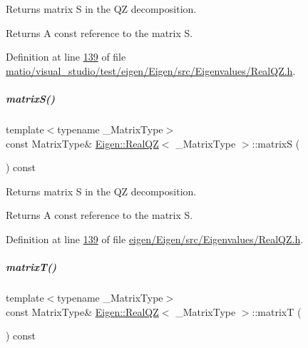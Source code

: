 Returns matrix S in the QZ decomposition. 

\begin{DoxyReturn}{Returns}
A const reference to the matrix S. 
\end{DoxyReturn}


Definition at line \hyperlink{matio_2visual__studio_2test_2eigen_2_eigen_2src_2_eigenvalues_2_real_q_z_8h_source_l00139}{139} of file \hyperlink{matio_2visual__studio_2test_2eigen_2_eigen_2src_2_eigenvalues_2_real_q_z_8h_source}{matio/visual\+\_\+studio/test/eigen/\+Eigen/src/\+Eigenvalues/\+Real\+Q\+Z.\+h}.

\mbox{\label{group___eigenvalues___module_ad24d7bf534afb55adaef00f00846adaf}} 
\subparagraph{\texorpdfstring{matrix\+S()}{matrixS()}\hspace{0.1cm}{\footnotesize\ttfamily [2/2]}}
{\footnotesize\ttfamily template$<$typename \+\_\+\+Matrix\+Type$>$ \\
const Matrix\+Type\& \hyperlink{group___eigenvalues___module_class_eigen_1_1_real_q_z}{Eigen\+::\+Real\+QZ}$<$ \+\_\+\+Matrix\+Type $>$\+::matrixS (\begin{DoxyParamCaption}{ }\end{DoxyParamCaption}) const\hspace{0.3cm}{\ttfamily [inline]}}



Returns matrix S in the QZ decomposition. 

\begin{DoxyReturn}{Returns}
A const reference to the matrix S. 
\end{DoxyReturn}


Definition at line \hyperlink{eigen_2_eigen_2src_2_eigenvalues_2_real_q_z_8h_source_l00139}{139} of file \hyperlink{eigen_2_eigen_2src_2_eigenvalues_2_real_q_z_8h_source}{eigen/\+Eigen/src/\+Eigenvalues/\+Real\+Q\+Z.\+h}.

\mbox{\label{group___eigenvalues___module_a8dc963d8ea2a17df9d8d718e9e34d06f}} 
\subparagraph{\texorpdfstring{matrix\+T()}{matrixT()}\hspace{0.1cm}{\footnotesize\ttfamily [1/2]}}
{\footnotesize\ttfamily template$<$typename \+\_\+\+Matrix\+Type$>$ \\
const Matrix\+Type\& \hyperlink{group___eigenvalues___module_class_eigen_1_1_real_q_z}{Eigen\+::\+Real\+QZ}$<$ \+\_\+\+Matrix\+Type $>$\+::matrixT (\begin{DoxyParamCaption}{ }\end{DoxyParamCaption}) const\hspace{0.3cm}{\ttfamily [inline]}}



